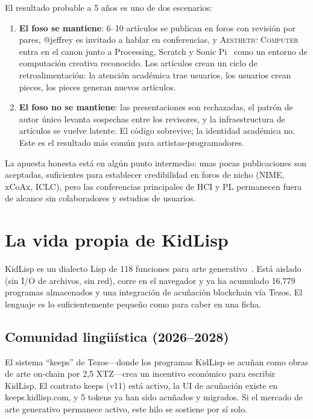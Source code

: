 \documentclass[10pt,letterpaper,twocolumn]{article}
\newcommand{\ac}{\textsc{Aesthetic Computer}}
\begin{document}
El resultado probable a 5 años es uno de dos escenarios:

\begin{enumerate}
  \item \textbf{El foso se mantiene}: 6--10 artículos se publican en foros con revisión por pares, @jeffrey es invitado a hablar en conferencias, y \ac{} entra en el canon junto a Processing, Scratch y Sonic Pi~\citep{aaron2016sonic} como un entorno de computación creativa reconocido. Los artículos crean un ciclo de retroalimentación: la atención académica trae usuarios, los usuarios crean pieces, los pieces generan nuevos artículos.
  \item \textbf{El foso no se mantiene}: las presentaciones son rechazadas, el patrón de autor único levanta sospechas entre los revisores, y la infraestructura de artículos se vuelve latente. El código sobrevive; la identidad académica no. Este es el resultado más común para artistas-programadores.
\end{enumerate}

La apuesta honesta está en algún punto intermedio: unas pocas publicaciones son aceptadas, suficientes para establecer credibilidad en foros de nicho (NIME, xCoAx, ICLC), pero las conferencias principales de HCI y PL permanecen fuera de alcance sin colaboradores y estudios de usuarios.


\section{La vida propia de KidLisp}
\label{sec:kidlisp}

KidLisp es un dialecto Lisp de 118 funciones para arte generativo~\citep{scudder2026kidlisp}. Está aislado (sin I/O de archivos, sin red), corre en el navegador y ya ha acumulado 16.779 programas almacenados y una integración de acuñación blockchain vía Tezos. El lenguaje es lo suficientemente pequeño como para caber en una ficha.

\subsection{Comunidad lingüística (2026--2028)}

El sistema ``keeps'' de Tezos---donde los programas KidLisp se acuñan como obras de arte on-chain por 2,5 XTZ---crea un incentivo económico para escribir KidLisp. El contrato keeps (v11) está activo, la UI de acuñación existe en keeps.kidlisp.com, y 5 tokens ya han sido acuñados y migrados. Si el mercado de arte generativo permanece activo, este hilo se sostiene por sí solo.
\end{document}
